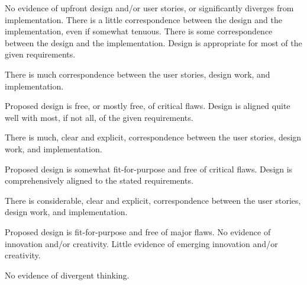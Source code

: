\documentclass{../../fal_assignment}
\begin{document}
\begin{markingrubric}
	\grade\fail No evidence of upfront design and/or user stories, or significantly diverges from implementation.
	\grade There is a little correspondence between the design and the implementation, even if somewhat tenuous.
	\grade There is some correspondence between the design and the implementation.
	\grade Design is appropriate for most of the given requirements.
	\par     There is much correspondence between the user stories, design work, and implementation.
	\par     Proposed design is free, or mostly free, of critical flaws.
	\grade Design is aligned quite well with most, if not all, of the given requirements.
	\par     There is much, clear and explicit, correspondence between the user stories, design work, and implementation.
	\par     Proposed design is somewhat fit-for-purpose and free of critical flaws.
	\grade Design is comprehensively aligned to the stated requirements.
	\par     There is considerable, clear and explicit, correspondence between the user stories, design work, and implementation.
	\par     Proposed design is fit-for-purpose and free of major flaws.
	\grade\fail No evidence of innovation and/or creativity.
	\grade Little evidence of emerging innovation and/or creativity.
	\par No evidence of divergent thinking.

\end{markingrubric}
\end{document}
